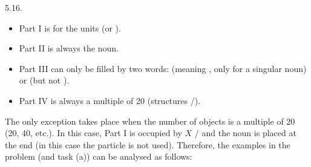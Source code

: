 \begin{refsection}
\begin{practiceproblemsolution}{5.16. \langnameIrish}
\begin{itemize}
\item Part I is for the units (or ).
\item Part II is always the noun.
\item Part III can only be filled by two words:  (meaning , only for a singular noun) or  (but not ).
\item Part IV is always a multiple of 20 (structures \slash{}).
\end{itemize}

 The only exception takes place when the number of objects is a multiple of 20 (20, 40, etc.). In this case, Part I is occupied by $X$ \slash{} and the noun is placed at the end (in this case the particle  is not used). Therefore, the examples in the problem (and task (a)) can be analysed as follows:


\end{practiceproblemsolution}
\end{refsection}
